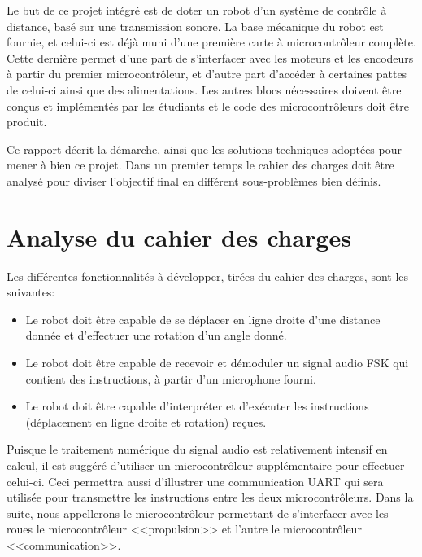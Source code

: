 Le but de ce projet intégré est de doter un robot d'un système de contrôle à distance, basé sur une transmission sonore. La base mécanique du robot est fournie, et celui-ci est déjà muni d'une première carte à microcontrôleur complète. Cette dernière permet d'une part de s'interfacer avec les moteurs et les encodeurs à partir du premier microcontrôleur, et d'autre part d'accéder à certaines pattes de celui-ci ainsi que des alimentations. Les autres blocs nécessaires doivent être conçus et implémentés par les étudiants et le code des microcontrôleurs doit être produit.

Ce rapport décrit la démarche, ainsi que les solutions techniques adoptées pour mener à bien ce projet. Dans un premier temps le cahier des charges doit être analysé pour diviser l'objectif final en différent sous-problèmes bien définis.

\section{Analyse du cahier des charges}
Les différentes fonctionnalités à développer, tirées du cahier des charges, sont les suivantes:
\begin{itemize}
  \item Le robot doit être capable de se déplacer en ligne droite d'une distance donnée et d'effectuer une rotation d'un angle donné.
  \item Le robot doit être capable de recevoir et démoduler un signal audio FSK qui contient des instructions, à partir d'un microphone fourni.
  \item Le robot doit être capable d’interpréter et d'exécuter les instructions (déplacement en ligne droite et rotation) reçues.
\end{itemize}

Puisque le traitement numérique du signal audio est relativement intensif en calcul, il est suggéré d'utiliser un microcontrôleur supplémentaire pour effectuer celui-ci. Ceci permettra aussi d'illustrer une communication UART qui sera utilisée pour transmettre les instructions entre les deux microcontrôleurs. Dans la suite, nous appellerons le microcontrôleur permettant de s'interfacer avec les roues le microcontrôleur <<propulsion>> et l'autre le microcontrôleur <<communication>>.

